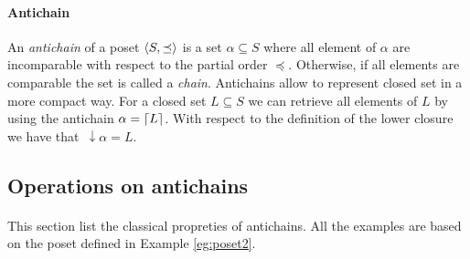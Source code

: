 \documentclass[letterpaper]{article}
\DeclarePairedDelimiter{\ceil}{\lceil}{\rceil}
\DeclarePairedDelimiter{\tuple}{\langle}{\rangle}
\newcommand{\darrow}{\, \downarrow \!\!}
\theoremstyle{definition}
\begin{document}
\paragraph{Antichain}

An \textit{antichain} of a poset $\tuple{S, \preceq}$
is a set $\alpha \subseteq S$ where all element of $\alpha$
are incomparable with respect to the partial order $\preceq$.
Otherwise, if all elements are comparable the set is called a \textit{chain}.
Antichains allow to represent closed set in a more compact way.
For a closed set $L \subseteq S$ we can retrieve all elements of $L$ by using
the antichain $\alpha = \ceil{L}$. With respect
to the definition of the lower closure we have that $\darrow \alpha = L$.

\subsection{Operations on antichains}

\paragraph{}

This section list the classical propreties of antichains.
All the examples are based on the poset
defined in Example \ref{eg:poset2}.
\end{document}
